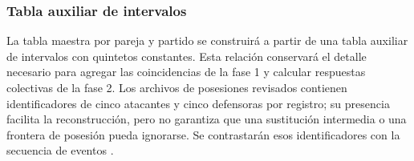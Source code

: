 \subsubsection*{Tabla auxiliar de intervalos}
La tabla maestra por pareja y partido se construirá a partir de una tabla auxiliar de intervalos con quintetos constantes. Esta relación conservará el detalle necesario para agregar las coincidencias de la fase 1 y calcular respuestas colectivas de la fase 2. Los archivos de posesiones revisados contienen identificadores de cinco atacantes y cinco defensoras por registro; su presencia facilita la reconstrucción, pero no garantiza que una sustitución intermedia o una frontera de posesión pueda ignorarse. Se contrastarán esos identificadores con la secuencia de eventos \cite{repositorioDatosTT,datosTTPbp}.

\begingroup
\small
{}
\setlength{\tabcolsep}{4pt}
\renewcommand{\arraystretch}{1.15}
